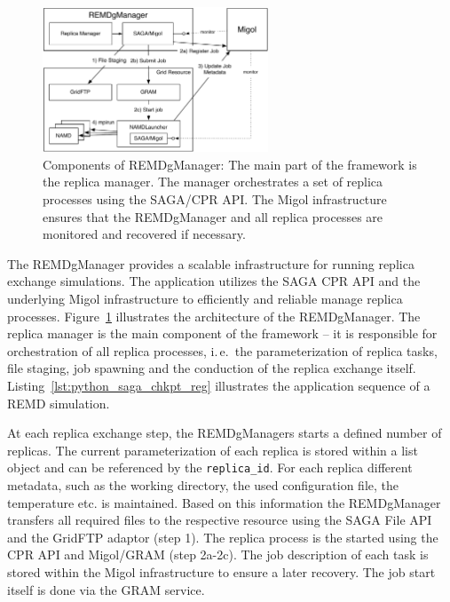 \documentclass[times, 10pt,twocolumn]{article}
\begin{document}
\begin{figure}[htbp]
      \centering
          \includegraphics[width=0.6\textwidth]{REMDgManager-architecture.pdf}
      \caption{Components of REMDgManager: The main part of the framework is the replica manager. The manager orchestrates a set of replica processes using the SAGA/CPR API. The Migol infrastructure ensures that the REMDgManager and all replica processes are monitored and recovered if necessary.}
      \label{fig:REMDgManager-architecture}
\end{figure}

                                  
The REMDgManager provides a scalable infrastructure for running replica exchange simulations. 
The application utilizes the SAGA CPR API and the underlying Migol infrastructure to 
efficiently and reliable manage replica processes. Figure~\ref{fig:REMDgManager-architecture} 
illustrates the architecture of the REMDgManager. The replica manager is the main component of 
the framework -- it is responsible for orchestration of all replica processes, i.\,e.\ the 
parameterization of replica tasks,  file staging, job spawning and the conduction of the 
replica exchange itself. Listing~\ref{lst:python_saga_chkpt_reg} illustrates the application sequence of a REMD simulation.
 
At each replica exchange step, the REMDgManagers starts a defined number of replicas. The 
current parameterization of each replica is stored within a list object and can be referenced 
by the \texttt{replica\_id}. For each replica different metadata, such as the working directory, 
the used configuration file, the temperature etc. is maintained.  Based on this information the 
REMDgManager transfers all required files to the respective resource using the SAGA File API and 
the GridFTP adaptor (step 1). The replica process is the started using the CPR API and Migol/GRAM (step 2a-2c). 
The job description of each task is stored within the Migol infrastructure to ensure a later recovery. 
The job start itself is done via the GRAM service. 
  
\end{document}
